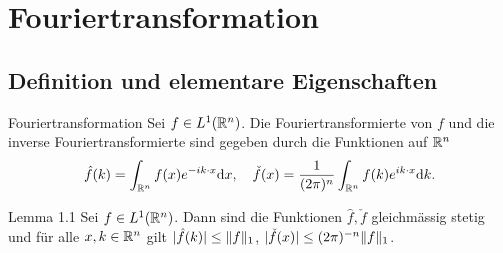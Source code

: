\chapter{Fouriertransformation}

\section{Definition und elementare Eigenschaften}

\begin{namedtheorem}{Fouriertransformation}
  Sei $f\in L^1(\mathbb{R}^n)$. Die Fouriertransformierte von $f$ und die inverse Fouriertransformierte sind gegeben durch die Funktionen auf $\mathbb{R}^n$
  \begin{align*}
  	\hat{f}(k) = \int_{\mathbb{R}^n} f(x) e^{-ik\cdot x} \mathrm{d} x, \quad \check{f}(x) = \frac1{(2\pi)^n} \int_{\mathbb{R}^n} f(k) e^{ik\cdot x} \mathrm{d} k.
  \end{align*}
\end{namedtheorem}

\begin{namedtheorem}{Lemma 1.1}
  Sei $f\in L^1(\mathbb{R}^n)$. Dann sind die Funktionen $\hat{f}, \check{f}$ gleichmässig stetig und für alle $x,k\in\mathbb{R}^n$ gilt $|\hat{f}(k)|\leq \lVert f\rVert_1$, $|\check{f}(x)|\leq(2\pi)^{-n}\lVert f\rVert_1$.
\end{namedtheorem}

